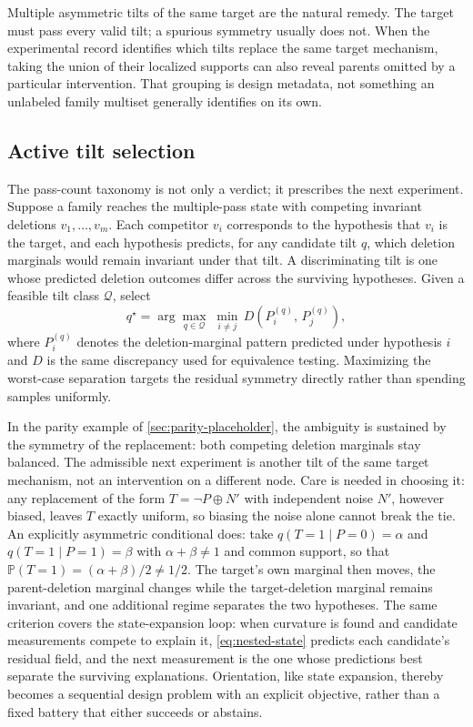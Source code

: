 \documentclass[11pt]{article}
\newcommand{\Pp}{\mathbb{P}}
\begin{document}
Multiple asymmetric tilts of the same target are the natural remedy.  The target must pass every valid tilt; a spurious symmetry usually does not.  When the experimental record identifies which tilts replace the same target mechanism, taking the union of their localized supports can also reveal parents omitted by a particular intervention.  That grouping is design metadata, not something an unlabeled family multiset generally identifies on its own.

\subsection{Active tilt selection}\label{sec:active-tilt}

The pass-count taxonomy is not only a verdict; it prescribes the next experiment.  Suppose a family reaches the multiple-pass state with competing invariant deletions \(v_1,\ldots,v_m\).  Each competitor \(v_i\) corresponds to the hypothesis that \(v_i\) is the target, and each hypothesis predicts, for any candidate tilt \(q\), which deletion marginals would remain invariant under that tilt.  A discriminating tilt is one whose predicted deletion outcomes differ across the surviving hypotheses.  Given a feasible tilt class \(\mathcal{Q}\), select
\begin{equation}
q^\star
=
\arg\max_{q\in\mathcal Q}\;
\min_{i\ne j}\,
D\!\left(P^{(q)}_{i},\,P^{(q)}_{j}\right),
\label{eq:active-tilt}
\end{equation}
where \(P^{(q)}_{i}\) denotes the deletion-marginal pattern predicted under hypothesis \(i\) and \(D\) is the same discrepancy used for equivalence testing.  Maximizing the worst-case separation targets the residual symmetry directly rather than spending samples uniformly.

In the parity example of \cref{sec:parity-placeholder}, the ambiguity is sustained by the symmetry of the replacement: both competing deletion marginals stay balanced.  The admissible next experiment is another tilt of the same target mechanism, not an intervention on a different node.  Care is needed in choosing it: any replacement of the form \(T=\neg P\oplus N'\) with independent noise \(N'\), however biased, leaves \(T\) exactly uniform, so biasing the noise alone cannot break the tie.  An explicitly asymmetric conditional does: take \(q(T=1\mid P=0)=\alpha\) and \(q(T=1\mid P=1)=\beta\) with \(\alpha+\beta\ne1\) and common support, so that \(\Pp(T=1)=(\alpha+\beta)/2\ne1/2\).  The target's own marginal then moves, the parent-deletion marginal changes while the target-deletion marginal remains invariant, and one additional regime separates the two hypotheses.  The same criterion covers the state-expansion loop: when curvature is found and candidate measurements compete to explain it, \cref{eq:nested-state} predicts each candidate's residual field, and the next measurement is the one whose predictions best separate the surviving explanations.  Orientation, like state expansion, thereby becomes a sequential design problem with an explicit objective, rather than a fixed battery that either succeeds or abstains.
\end{document}

